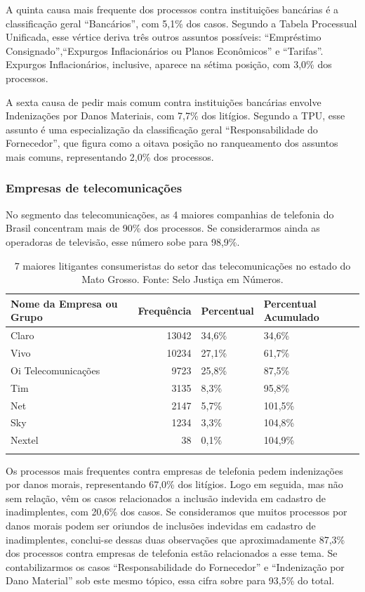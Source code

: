 \documentclass[]{report}
\begin{document}
A quinta causa mais frequente dos processos contra instituições
bancárias é a classificação geral ``Bancários'', com 5,1\% dos casos.
Segundo a Tabela Processual Unificada, esse vértice deriva três outros
assuntos possíveis: ``Empréstimo Consignado'',``Expurgos Inflacionários
ou Planos Econômicos'' e ``Tarifas''. Expurgos Inflacionários,
inclusive, aparece na sétima posição, com 3,0\% dos processos.

A sexta causa de pedir mais comum contra instituições bancárias envolve
Indenizações por Danos Materiais, com 7,7\% dos litígios. Segundo a TPU,
esse assunto é uma especialização da classificação geral
``Responsabilidade do Fornecedor'', que figura como a oitava posição no
ranqueamento dos assuntos mais comuns, representando 2,0\% dos
processos.

\subsubsection{Empresas de
telecomunicações}\label{empresas-de-telecomunicacoes-2}

No segmento das telecomunicações, as 4 maiores companhias de telefonia
do Brasil concentram mais de 90\% dos processos. Se considerarmos ainda
as operadoras de televisão, esse número sobe para 98,9\%.

\begin{longtable}{lrll}
\caption{7 maiores litigantes consumeristas do setor das telecomunicações no estado do Mato Grosso. Fonte: Selo Justiça em Números.} \\
  \hline
Nome da Empresa ou Grupo & Frequência & Percentual & Percentual Acumulado \\
  \hline
Claro & 13042 & 34,6\% & 34,6\% \\
  Vivo & 10234 & 27,1\% & 61,7\% \\
  Oi
Telecomunicações & 9723 & 25,8\% & 87,5\% \\
  Tim & 3135 & 8,3\% & 95,8\% \\
  Net & 2147 & 5,7\% & 101,5\% \\
  Sky & 1234 & 3,3\% & 104,8\% \\
  Nextel &  38 & 0,1\% & 104,9\% \\
   \hline
\hline
\label{unnamed-chunk-47}
\end{longtable}

Os processos mais frequentes contra empresas de telefonia pedem
indenizações por danos morais, representando 67,0\% dos litígios. Logo
em seguida, mas não sem relação, vêm os casos relacionados a inclusão
indevida em cadastro de inadimplentes, com 20,6\% dos casos. Se
consideramos que muitos processos por danos morais podem ser oriundos de
inclusões indevidas em cadastro de inadimplentes, conclui-se dessas duas
observações que aproximadamente 87,3\% dos processos contra empresas de
telefonia estão relacionados a esse tema. Se contabilizarmos os casos
``Responsabilidade do Fornecedor'' e ``Indenização por Dano Material''
sob este mesmo tópico, essa cifra sobre para 93,5\% do total.
\end{document}

